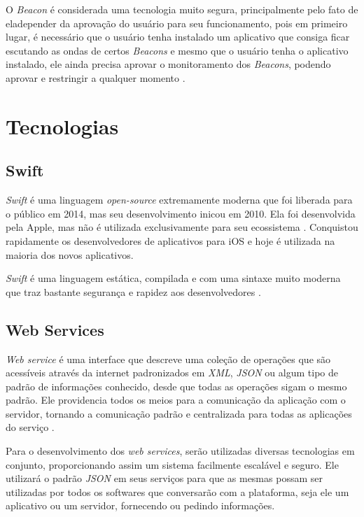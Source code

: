 \documentclass[
	12pt,
	oneside,
	a4paper,
	english,
	brazil,
]{abntex2}
\begin{document}
O \emph{Beacon} é considerada uma tecnologia muito segura, principalmente pelo fato de eladepender da aprovação do usuário para seu funcionamento, pois em primeiro lugar, é necessário que o usuário tenha instalado um aplicativo que consiga ficar escutando as ondas de certos \emph{Beacons} e mesmo que o usuário tenha o aplicativo instalado, ele ainda precisa aprovar o monitoramento dos \emph{Beacons}, podendo aprovar e restringir a qualquer momento \cite{beacon-what-is-it-forbes}.

\section{Tecnologias}

\subsection{Swift}

\emph{Swift} é uma linguagem \emph{open-source} extremamente moderna que foi liberada para o público em 2014, mas seu desenvolvimento inicou em 2010. Ela foi desenvolvida pela Apple, mas não é utilizada exclusivamente para seu ecossistema \cite{swift-about}. Conquistou rapidamente os desenvolvedores de aplicativos para iOS e hoje é utilizada na maioria dos novos aplicativos.

\emph{Swift} é uma linguagem estática, compilada e com uma sintaxe muito moderna que traz bastante segurança e rapidez aos desenvolvedores \cite{swift-about}.

\subsection{Web Services}

\emph{Web service} é uma interface que descreve uma coleção de operações que são acessíveis através da internet padronizados em \emph{XML}, \emph{JSON} ou algum tipo de padrão de informações conhecido, desde que todas as operações sigam o mesmo padrão. Ele providencia todos os meios para a comunicação da aplicação com o servidor, tornando a comunicação padrão e centralizada para todas as aplicações do serviço \cite{introduction-web-services}.

Para o desenvolvimento dos \emph{web services}, serão utilizadas diversas tecnologias em conjunto, proporcionando assim um sistema facilmente escalável e seguro. Ele utilizará o padrão \emph{JSON} em seus serviços para que as mesmas possam ser utilizadas por todos os softwares que conversarão com a plataforma, seja ele um aplicativo ou um servidor, fornecendo ou pedindo informações.
\end{document}
